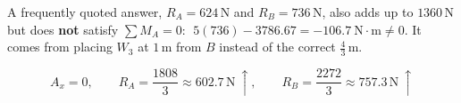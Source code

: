 \documentclass[12pt,a4paper]{article}
\newcommand{\N}{\,\mathrm{N}}
\newcommand{\m}{\,\mathrm{m}}
\begin{document}
\begin{note}
A frequently quoted answer, $R_A=624\N$ and $R_B=736\N$, also adds up to $1360\N$ but
does \textbf{not} satisfy $\sum M_A=0$:
$\;5(736)-3786.67=-106.7\ \mathrm{N\cdot m}\neq 0$.
It comes from placing $W_3$ at $1\m$ from $B$ instead of the correct $\tfrac43\m$.
\end{note}

\begin{answer}
\[
  A_x = 0, \qquad
  R_A = \frac{1808}{3}\approx 602.7\N\ \uparrow, \qquad
  R_B = \frac{2272}{3}\approx 757.3\N\ \uparrow
\]
\end{answer}
\end{document}

